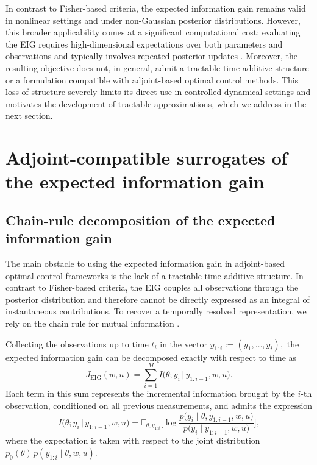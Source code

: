 \documentclass[a4paper,11pt]{article}
\newcommand{\E}{\mathbb{E}}
\begin{document}
In contrast to Fisher-based criteria, the expected information gain remains valid in nonlinear settings and under non-Gaussian posterior distributions. However, this broader applicability comes at a significant computational cost: evaluating the
EIG requires high-dimensional expectations over both parameters and observations and
typically involves repeated posterior updates \cite{Ryan2016,huanmarzouk2013}. Moreover, the resulting objective does not, in general, admit a tractable time-additive structure or a formulation compatible with
adjoint-based optimal control methods.
This loss
of structure severely limits its direct use in controlled dynamical settings and motivates the
development of tractable approximations, which we address in the next section.

\section{Adjoint-compatible surrogates of the expected information gain}\label{sec:surrogates}

\subsection{Chain-rule decomposition of the expected information gain}

The main obstacle to using the expected information gain in adjoint-based optimal control
frameworks is the lack of a tractable time-additive structure. In contrast to Fisher-based criteria, the
EIG couples all observations through the posterior distribution and therefore cannot be
directly expressed as an integral of instantaneous contributions. To recover a temporally
resolved representation, we rely on the chain rule for mutual information \cite{coverthomas1991}.

Collecting the observations up to time $t_i$ in the vector
\(
y_{1:i} := (y_1,\dots,y_i),
\)
the expected information gain can be decomposed exactly with respect to time as
\begin{equation}
  J_\mathrm{EIG}(w,u)
  =
  \sum_{i=1}^{M}
  I\bigl(\theta; y_i \,\big|\, y_{1:i-1},w,u\bigr).
  \label{eq:MI-chain-rule}
\end{equation}
Each term in this sum represents
the incremental information brought by the $i$-th observation, conditioned on all previous
measurements, and admits the expression
\begin{equation}
  I\bigl(\theta; y_i \,\big|\, y_{1:i-1},w,u\bigr)
  =
  \E_{\theta, y_{1:i}}\biggl[
    \log \frac{p\bigl(y_i \mid \theta, y_{1:i-1},w,u\bigr)}
              {p\bigl(y_i \mid y_{1:i-1},w,u\bigr)}
  \biggr],
  \label{eq:MI-increment-conditional}
\end{equation}
where the expectation is taken with respect to the joint distribution
$p_0(\theta)\,p(y_{1:i} \mid \theta,w,u)$.
\end{document}
